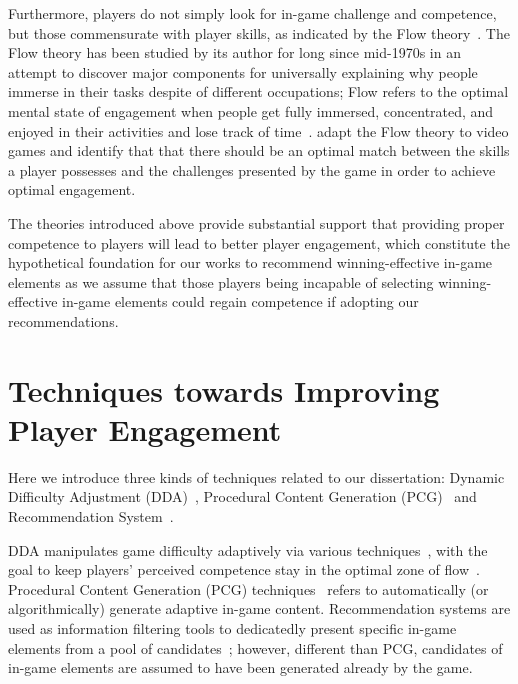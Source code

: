 Furthermore, players do not simply look for in-game challenge and competence, but those commensurate with player skills, as indicated by the Flow theory~\cite{flow1990psychology}. The Flow theory has been studied by its author for long since mid-1970s in an attempt to discover major components for universally explaining why people immerse in their tasks despite of different occupations; Flow refers to the optimal mental state of engagement when people get fully immersed, concentrated, and enjoyed in their activities and lose track of time~\cite{flow1990psychology}. \cite{sweetser2005gameflow,chen2007flow} adapt the Flow theory to video games and identify that that there should be an optimal match between the skills a player possesses and the challenges presented by the game in order to achieve optimal engagement. 

The theories introduced above provide substantial support that providing proper competence to players will lead to better player engagement, which constitute the hypothetical foundation for our works to recommend winning-effective in-game elements as we assume that those players being incapable of selecting winning-effective in-game elements could regain competence if adopting our recommendations. 


\section{Techniques towards Improving Player Engagement}

Here we introduce three kinds of techniques related to our dissertation: Dynamic Difficulty Adjustment (DDA)~\cite{hunicke2005case}, Procedural Content Generation (PCG)~\cite{yannakakis2011experience,togelius2011search} and Recommendation System~\cite{medler2011using}. 


DDA manipulates game difficulty adaptively via various techniques~\cite{hunicke2005case}, with the goal to keep players' perceived competence stay in the optimal zone of flow~\cite{flow1990psychology,sweetser2005gameflow,chen2007flow}. Procedural Content Generation (PCG) techniques~\cite{yannakakis2011experience,togelius2011search} refers to automatically (or algorithmically) generate adaptive in-game content. Recommendation systems are used as information filtering tools to dedicatedly present specific in-game elements from a pool of candidates~\cite{medler2011using}; however, different than PCG, candidates of in-game elements are assumed to have been generated already by the game.

